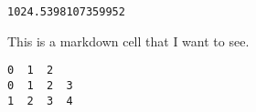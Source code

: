             \begin{tcolorbox}[breakable, size=fbox, boxrule=.5pt, pad at break*=1mm, opacityfill=0]
\begin{Verbatim}[commandchars=\\\{\}]
1024.5398107359952
\end{Verbatim}
\end{tcolorbox}
        
    This is a markdown cell that I want to see.

            \begin{tcolorbox}[breakable, size=fbox, boxrule=.5pt, pad at break*=1mm, opacityfill=0]
\begin{Verbatim}[commandchars=\\\{\}]
   0  1  2
0  1  2  3
1  2  3  4
\end{Verbatim}
\end{tcolorbox}
        

